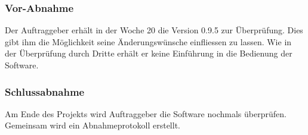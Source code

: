 \subsubsection{Vor-Abnahme} \label{subsubsec:1}

Der Auftraggeber erhält in der Woche 20 die Version 0.9.5 zur Überprüfung. Dies gibt ihm die Möglichkeit seine Änderungswünsche einfliessen zu lassen. Wie in der Überprüfung durch Dritte erhält er keine Einführung in die Bedienung der Software.

\subsubsection{Schlussabnahme} \label{subsubsec:2}

Am Ende des Projekts wird Auftraggeber die Software nochmals überprüfen. Gemeinsam wird ein Abnahmeprotokoll erstellt.